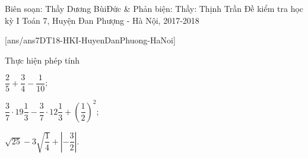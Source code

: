 	\begin{name}
		{Biên soạn: Thầy Dương BùiĐức \& Phản biện: Thầy: Thịnh Trần}
		{Đề kiểm tra học kỳ I Toán 7, Huyện Đan Phượng - Hà Nội, 2017-2018}
	\end{name}
	\setcounter{ex}{0}
	[ans/ans7DT18-HKI-HuyenDanPhuong-HaNoi]
		\begin{ex}%
		Thực hiện phép tính
		\begin{enumEX}{3}
			\item $ \dfrac{2}{5}+\dfrac{3}{4}-\dfrac{1}{10} $;
			\item $ \dfrac{3}{7}\cdot 19\dfrac{1}{3}-\dfrac{3}{7}\cdot 12\dfrac{1}{3}+\left(\dfrac{1}{2}\right)^{2} $;
			\item $ \sqrt{25}-3\sqrt{\dfrac{1}{4}}+\left| -\dfrac{3}{2}\right|  $.
		\end{enumEX}	
		\end{ex}
